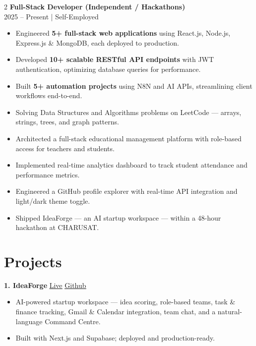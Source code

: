 \documentclass[letterpaper,10pt]{article}
\begin{document}
\begin{paracol}{2}
\noindent\textbf{Full-Stack Developer (Independent / Hackathons)} \\
\small 2025 -- Present \enspace | \enspace Self-Employed \par
\vspace{2pt}
\begin{itemize}
  \item \small Engineered \textbf{5+ full-stack web applications} using React.js, Node.js, Express.js \& MongoDB, each deployed to production.
  \item \small Developed \textbf{10+ scalable RESTful API endpoints} with JWT authentication, optimizing database queries for performance.
  \item \small Built \textbf{5+ automation projects} using N8N and AI APIs, streamlining client workflows end-to-end.
  \item \small Solving Data Structures and Algorithms problems on LeetCode — arrays, strings, trees, and graph patterns.
  \item \small Architected a full-stack educational management platform with role-based access for teachers and students.
  \item \small Implemented real-time analytics dashboard to track student attendance and performance metrics.
  \item \small Engineered a GitHub profile explorer with real-time API integration and light/dark theme toggle.
  \item \small Shipped IdeaForge — an AI startup workspace — within a 48-hour hackathon at CHARUSAT.
\end{itemize}

\vspace{6pt}

\section{Projects}

\noindent\textbf{1. IdeaForge} \hfill \href{https://crmideaforge.onrender.com}{\small\underline{Live}} \enspace \href{https://github.com/KHUSHPATEL143/ideaForge}{\small\underline{Github}}
\begin{itemize}
  \item \small AI-powered startup workspace — idea scoring, role-based teams, task \& finance tracking, Gmail \& Calendar integration, team chat, and a natural-language Command Centre.
  \item \small Built with Next.js and Supabase; deployed and production-ready.
\end{itemize}


\end{paracol}
\end{document}
